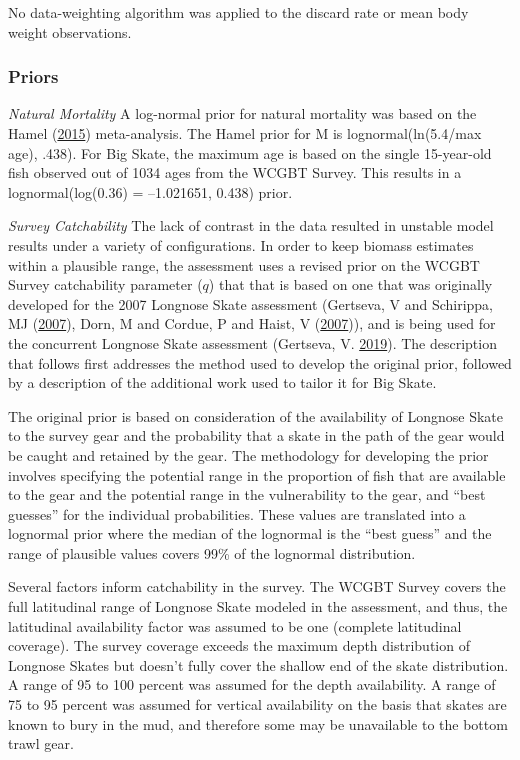 \documentclass[12pt,]{article}
\begin{document}
No data-weighting algorithm was applied to the discard rate or mean body
weight observations.

\hypertarget{priors}{%
\subsubsection{Priors}\label{priors}}

\emph{Natural Mortality} A log-normal prior for natural mortality was
based on the Hamel (\protect\hyperlink{ref-Hamel2015}{2015})
meta-analysis. The Hamel prior for M is lognormal(ln(5.4/max age),
.438). For Big Skate, the maximum age is based on the single 15-year-old
fish observed out of 1034 ages from the WCGBT Survey. This results in a
lognormal(log(0.36) = --1.021651, 0.438) prior.

\vspace{.5cm}

\emph{Survey Catchability} The lack of contrast in the data resulted in
unstable model results under a variety of configurations. In order to
keep biomass estimates within a plausible range, the assessment uses a
revised prior on the WCGBT Survey catchability parameter (\(q\)) that
that is based on one that was originally developed for the 2007 Longnose
Skate assessment (Gertseva, V and Schirippa, MJ
(\protect\hyperlink{ref-Gertseva2007}{2007}), Dorn, M and Cordue, P and
Haist, V (\protect\hyperlink{ref-Dorn2007}{2007})), and is being used
for the concurrent Longnose Skate assessment (Gertseva, V.
\protect\hyperlink{ref-Gertseva2019}{2019}). The description that
follows first addresses the method used to develop the original prior,
followed by a description of the additional work used to tailor it for
Big Skate.

The original prior is based on consideration of the availability of
Longnose Skate to the survey gear and the probability that a skate in
the path of the gear would be caught and retained by the gear. The
methodology for developing the prior involves specifying the potential
range in the proportion of fish that are available to the gear and the
potential range in the vulnerability to the gear, and ``best guesses''
for the individual probabilities. These values are translated into a
lognormal prior where the median of the lognormal is the ``best guess''
and the range of plausible values covers 99\% of the lognormal
distribution.

Several factors inform catchability in the survey. The WCGBT Survey
covers the full latitudinal range of Longnose Skate modeled in the
assessment, and thus, the latitudinal availability factor was assumed to
be one (complete latitudinal coverage). The survey coverage exceeds the
maximum depth distribution of Longnose Skates but doesn't fully cover
the shallow end of the skate distribution. A range of 95 to 100 percent
was assumed for the depth availability. A range of 75 to 95 percent was
assumed for vertical availability on the basis that skates are known to
bury in the mud, and therefore some may be unavailable to the bottom
trawl gear.
\end{document}
